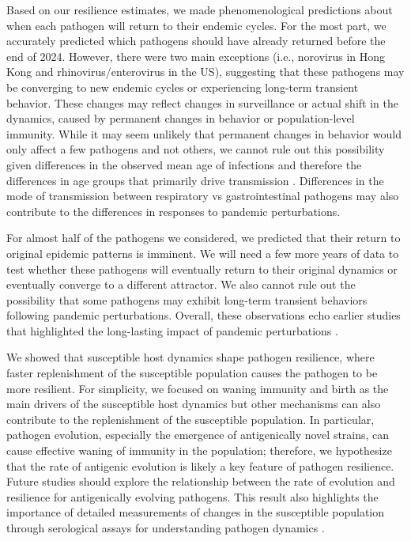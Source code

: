 \documentclass[12pt]{article}
\begin{document}
Based on our resilience estimates, we made phenomenological predictions about when each pathogen will return to their endemic cycles.
For the most part, we accurately predicted which pathogens should have already returned before the end of 2024.
However, there were two main exceptions (i.e., norovirus in Hong Kong and rhinovirus/enterovirus in the US), suggesting that these pathogens may be converging to new endemic cycles or experiencing long-term transient behavior.
These changes may reflect changes in surveillance or actual shift in the dynamics, caused by permanent changes in behavior or population-level immunity.
While it may seem unlikely that permanent changes in behavior would only affect a few pathogens and not others, we cannot rule out this possibility given differences in the observed mean age of infections and therefore the differences in age groups that primarily drive transmission \citep{radin2014epidemiology,lv2024epidemiological}.
Differences in the mode of transmission between respiratory vs gastrointestinal pathogens may also contribute to the differences in responses to pandemic perturbations.

For almost half of the pathogens we considered, we predicted that their return to original epidemic patterns is imminent.
We will need a few more years of data to test whether these pathogens will eventually return to their original dynamics or eventually converge to a different attractor.
We also cannot rule out the possibility that some pathogens may exhibit long-term transient behaviors following pandemic perturbations.
Overall, these observations echo earlier studies that highlighted the long-lasting impact of pandemic perturbations \citep{baker2022long,caini2024probable,chen2024covid,park2024predicting,nielsen2025complex}. 

We showed that susceptible host dynamics shape pathogen resilience, where faster replenishment of the susceptible population causes the pathogen to be more resilient.
For simplicity, we focused on waning immunity and birth as the main drivers of the susceptible host dynamics but other mechanisms can also contribute to the replenishment of the susceptible population.
In particular, pathogen evolution, especially the emergence of antigenically novel strains, can cause effective waning of immunity in the population;
therefore, we hypothesize that the rate of antigenic evolution is likely a key feature of pathogen resilience.
Future studies should explore the relationship between the rate of evolution and resilience for antigenically evolving pathogens.
This result also highlights the importance of detailed measurements of changes in the susceptible population through serological assays for understanding pathogen dynamics \citep{nguyen2022enterovirus}.
\end{document}
